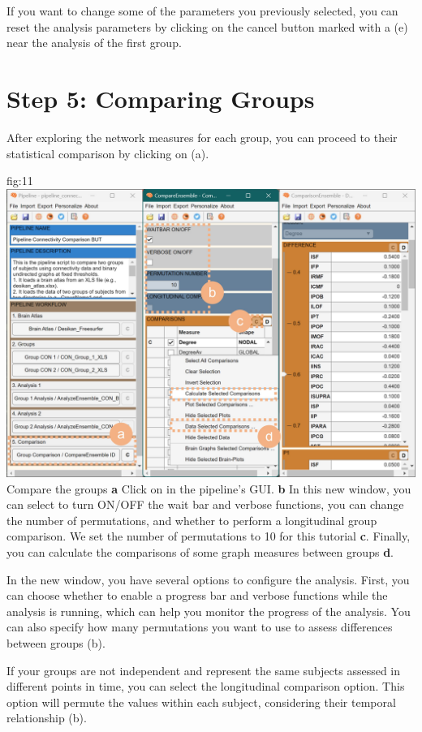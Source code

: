 \documentclass[justified]{tufte-handout}
\begin{document}
If you want to change some of the parameters you previously selected, you can reset the analysis parameters by clicking on the cancel button marked with a  (e) near the analysis of the first group.
 
\clearpage
\section{Step 5: Comparing Groups}

After exploring the network measures for each group, you can proceed to their statistical comparison by clicking on  (a).

	{fig:11}
	{
	\includegraphics{fig11.jpg}
	}
	{Compare the groups}
	{
	{\bf a} Click on  in the pipeline's GUI.
	{\bf b} In this new window, you can select to turn ON/OFF the wait bar and verbose functions, you can change the number of permutations, and whether to perform a longitudinal group comparison. We set the number of permutations to 10 for this tutorial {\bf c}. Finally, you can calculate the comparisons of some graph measures between groups {\bf d}.
	}
	
In the new window, you have several options to configure the analysis. First, you can choose whether to enable a progress bar and verbose functions while the analysis is running, which can help you monitor the progress of the analysis. You can also specify how many permutations you want to use to assess differences between groups (b).

If your groups are not independent and represent the same subjects assessed in different points in time, you can select the longitudinal comparison option. This option will permute the values within each subject, considering their temporal relationship (b).
\end{document}
